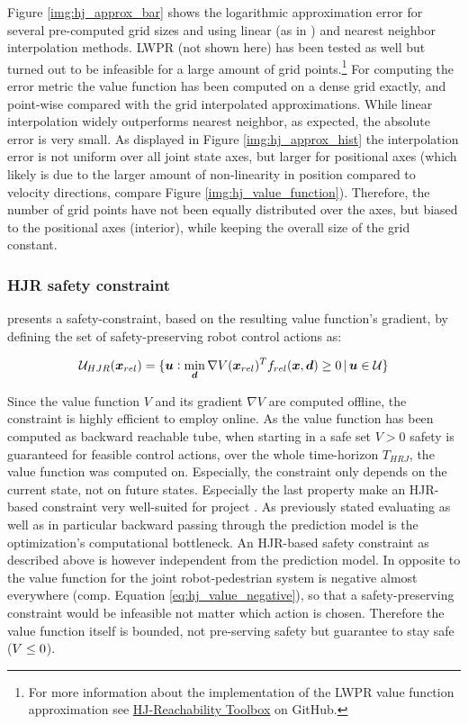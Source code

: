 Figure \ref{img:hj_approx_bar} shows the logarithmic approximation error for several pre-computed grid sizes and using linear (as in \cite{Leung2020}) and nearest neighbor interpolation methods. LWPR (not shown here) has been tested as well but turned out to be infeasible for a large amount of grid points.\footnote{For more information about the implementation of the LWPR value function approximation see \href{https://github.com/simon-schaefer/HJReachibility}{HJ-Reachability Toolbox} on GitHub.} For computing the error metric the value function has been computed on a dense grid exactly, and point-wise compared with the grid interpolated approximations. While linear interpolation widely outperforms nearest neighbor, as expected, the absolute error is very small. As displayed in Figure \ref{img:hj_approx_hist} the interpolation error is not uniform over all joint state axes, but larger for positional axes (which likely is due to the larger amount of non-linearity in position compared to velocity directions, compare Figure \ref{img:hj_value_function}). Therefore, the number of grid points have not been equally distributed over the axes, but biased to the positional axes (interior), while keeping the overall size of the grid constant. 

\subsubsection{\ac{HJR} safety constraint} 
\cite{Leung2020} presents a safety-constraint, based on the resulting value function's gradient, by defining the set of safety-preserving robot control actions as:

\begin{equation}
\mathcal{U}_{HJR} (\boldsymbol{x}_{rel}) = \{ \boldsymbol{u}: \min_{\boldsymbol{d}} \nabla V (\boldsymbol{x}_{rel})^T f_{rel}(\boldsymbol{x}, \boldsymbol{d}) \geq 0 \, | \, \boldsymbol{u} \in \mathcal{U} \}
\end{equation}

Since the value function $V$ and its gradient $\nabla V$ are computed offline, the constraint is highly efficient to employ online. As the value function has been computed as backward reachable tube, when starting in a safe set $V > 0$ safety is guaranteed for feasible control actions, over the whole time-horizon $T_{HRJ}$, the value function was computed on. Especially, the constraint only depends on the current state, not on future states. Especially the last property make an \ac{HJR}-based constraint very well-suited for project \project. As previously stated evaluating as well as in particular backward passing through the prediction model is the optimization's computational bottleneck. An \ac{HJR}-based safety constraint as described above is however independent from the prediction model. 
\newline
In opposite to \cite{Leung2020} the value function for the joint robot-pedestrian system is negative almost everywhere (comp. Equation \ref{eq:hj_value_negative}), so that a safety-preserving constraint would be infeasible not matter which action is chosen. Therefore the value function itself is bounded, not pre-serving safety but guarantee to stay safe ($V \leq 0$).


